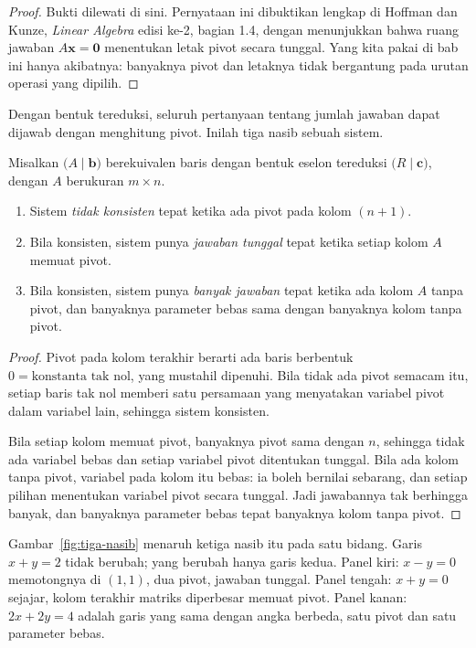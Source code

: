 \begin{proof}
Bukti dilewati di sini. Pernyataan ini dibuktikan lengkap di Hoffman dan Kunze,
\emph{Linear Algebra} edisi ke-2, bagian 1.4, dengan menunjukkan bahwa ruang jawaban
$A\mathbf{x}=\mathbf{0}$ menentukan letak pivot secara tunggal. Yang kita pakai di bab ini
hanya akibatnya: banyaknya pivot dan letaknya tidak bergantung pada urutan operasi yang
dipilih.
\end{proof}

Dengan bentuk tereduksi, seluruh pertanyaan tentang jumlah jawaban dapat dijawab dengan
menghitung pivot. Inilah tiga nasib sebuah sistem.

\begin{teorema}
Misalkan $\bigl(A\mid\mathbf{b}\bigr)$ berekuivalen baris dengan bentuk eselon tereduksi
$\bigl(R\mid\mathbf{c}\bigr)$, dengan $A$ berukuran $m\times n$.
\begin{enumerate}
  \item Sistem \emph{tidak konsisten} tepat ketika ada pivot pada kolom $(n+1)$.
  \item Bila konsisten, sistem punya \emph{jawaban tunggal} tepat ketika setiap kolom $A$
        memuat pivot.
  \item Bila konsisten, sistem punya \emph{banyak jawaban} tepat ketika ada kolom $A$
        tanpa pivot, dan banyaknya parameter bebas sama dengan banyaknya kolom tanpa pivot.
\end{enumerate}
\end{teorema}

\begin{proof}
Pivot pada kolom terakhir berarti ada baris berbentuk $0=\text{konstanta tak nol}$, yang
mustahil dipenuhi. Bila tidak ada pivot semacam itu, setiap baris tak nol memberi satu
persamaan yang menyatakan variabel pivot dalam variabel lain, sehingga sistem konsisten.

Bila setiap kolom memuat pivot, banyaknya pivot sama dengan $n$, sehingga tidak ada variabel
bebas dan setiap variabel pivot ditentukan tunggal. Bila ada kolom tanpa pivot, variabel
pada kolom itu bebas: ia boleh bernilai sebarang, dan setiap pilihan menentukan variabel
pivot secara tunggal. Jadi jawabannya tak berhingga banyak, dan banyaknya parameter bebas
tepat banyaknya kolom tanpa pivot.
\end{proof}

Gambar~\ref{fig:tiga-nasib} menaruh ketiga nasib itu pada satu bidang. Garis $x+y=2$
tidak berubah; yang berubah hanya garis kedua. Panel kiri: $x-y=0$ memotongnya di $(1,1)$,
dua pivot, jawaban tunggal. Panel tengah: $x+y=0$ sejajar, kolom terakhir matriks diperbesar
memuat pivot. Panel kanan: $2x+2y=4$ adalah garis yang sama dengan angka berbeda, satu pivot
dan satu parameter bebas.

